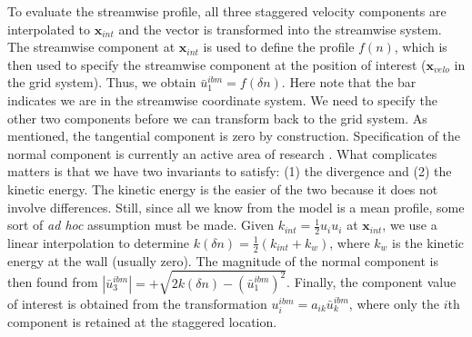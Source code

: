\documentclass[12pt]{article}
\begin{document}
To evaluate the streamwise profile, all three staggered velocity components are interpolated to $\mathbf{x}_{int}$ and the vector is transformed into the streamwise system.  The streamwise component at $\mathbf{x}_{int}$ is used to define the profile $f(n)$, which is then used to specify the streamwise component at the position of interest ($\mathbf{x}_{velo}$ in the grid system).  Thus, we obtain $\bar{u}_1^{ibm} = f(\delta n)$.  Here note that the bar indicates we are in the streamwise coordinate system.  We need to specify the other two components before we can transform back to the grid system.  As mentioned, the tangential component is zero by construction. Specification of the normal component is currently an active area of research \cite{Choi:2007}.  What complicates matters is that we have two invariants to satisfy: (1) the divergence and (2) the kinetic energy. The kinetic energy is the easier of the two because it does not involve differences.  Still, since all we know from the model is a mean profile, some sort of \emph{ad hoc} assumption must be made.  Given $k_{int}=\frac{1}{2}u_i u_i$ at $\mathbf{x}_{int}$, we use a linear interpolation to determine $k(\delta n) = \frac{1}{2}(k_{int} + k_w)$, where $k_w$ is the kinetic energy at the wall (usually zero).  The magnitude of the normal component is then found from $|\bar{u}_3^{ibm}| = +\sqrt{2k(\delta n) - (\bar{u}_1^{ibm})^2}$.  Finally, the component value of interest is obtained from the transformation $u_i^{ibm} = a_{ik} \bar{u}_k^{ibm}$, where only the $i$th component is retained at the staggered location.
\end{document}
